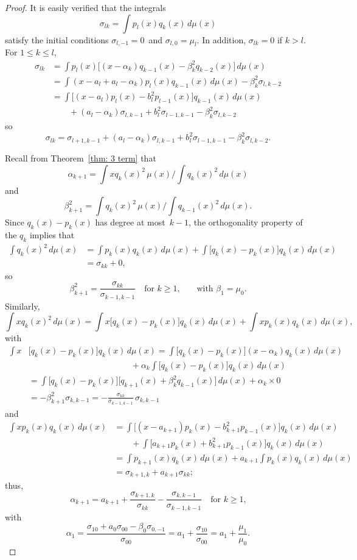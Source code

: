 \documentclass[12pt,a4paper]{article}
\begin{document}
\begin{proof}
It is easily verified that the integrals
\[
\sigma_{lk}=\int p_l(x)q_k(x)\,d\mu(x)
\]
satisfy the initial conditions $\sigma_{l,-1}=0$~and 
$\sigma_{l,0}=\mu_l$.  In addition, $\sigma_{lk}=0$ if $k>l$. 
For $1\le k\le l$,
\begin{align*}
\sigma_{lk}&=\int p_l(x)\bigl[
(x-\alpha_k)q_{k-1}(x)-\beta_k^2q_{k-2}(x)\bigr]\,d\mu(x)\\
	&=\int(x-a_l+a_l-\alpha_k)p_l(x)q_{k-1}(x)\,d\mu(x)
		-\beta_k^2\sigma_{l,k-2}\\
	&=\int\bigl[(x-a_l)p_l(x)-b_l^2p_{l-1}(x)\bigr]
		q_{k-1}(x)\,d\mu(x)\\
	&\qquad{}+(a_l-\alpha_k)\sigma_{l,k-1}
		+b_l^2\sigma_{l-1,k-1}-\beta_k^2\sigma_{l,k-2}
\end{align*}
so
\[
\sigma_{lk}=\sigma_{l+1,k-1}+(a_l-\alpha_k)\sigma_{l,k-1}
		+b_l^2\sigma_{l-1,k-1}-\beta_k^2\sigma_{l,k-2}.
\]

Recall from Theorem~\ref{thm: 3 term} that
\[
\alpha_{k+1}=\int xq_k(x)^2\,\mu(x)\bigg/\int q_k(x)^2\,d\mu(x)
\]
and
\[
\beta_{k+1}^2=\int q_k(x)^2\,\mu(x)\bigg/\int q_{k-1}(x)^2\,d\mu(x).
\]
Since $q_k(x)-p_k(x)$ has degree at most~$k-1$, the orthogonality 
property of the $q_k$ implies that
\begin{align*}
\int q_k(x)^2\,d\mu(x)&=\int p_k(x)q_k(x)\,d\mu(x)
	+\int\bigl[q_k(x)-p_k(x)\bigr]q_k(x)\,d\mu(x)\\
	&=\sigma_{kk}+0,
\end{align*}
so
\[
\beta_{k+1}^2=\frac{\sigma_{kk}}{\sigma_{k-1,k-1}}
	\quad\text{for $k\ge1$,}
	\qquad\text{with $\beta_1=\mu_0$.}
\]
Similarly,
\[
\int x q_k(x)^2\,d\mu(x)
	=\int x\bigl[q_k(x)-p_k(x)\bigr]q_k(x)\,d\mu(x)
	+\int xp_k(x)q_k(x)\,d\mu(x),
\]
with
\begin{align*}
\int x&\bigl[q_k(x)-p_k(x)\bigr]q_k(x)\,d\mu(x)
	=\int\bigl[q_k(x)-p_k(x)\bigr](x-\alpha_k)q_k(x)\,d\mu(x)\\
	&\qquad\qquad\qquad\qquad\qquad\qquad{}+\alpha_k\int 
		\bigl[q_k(x)-p_k(x)\bigr]q_k(x)\,d\mu(x)\\
	&=\int\bigl[q_k(x)-p_k(x)\bigr]
	\bigl[q_{k+1}(x)+\beta_k^2 q_{k-1}(x)\bigr] 
		\,d\mu(x)+\alpha_k\times0\\
	&=-\beta_{k+1}^2\sigma_{k,k-1}
	=-\frac{\sigma_{kk}}{\sigma_{k-1,k-1}}\,\sigma_{k,k-1}
\end{align*}
and
\begin{align*}
\int xp_k(x)q_k(x)\,d\mu(x)&=\int\bigl[
	(x-a_{k+1})p_k(x)-b_{k+1}^2p_{k-1}(x)\bigr]q_k(x)\,d\mu(x)\\
	&\qquad{}+\int\bigl[
		a_{k+1}p_k(x)+b_{k+1}^2p_{k-1}(x)\bigr]q_k(x)\,d\mu(x)\\
	&=\int p_{k+1}(x)q_k(x)\,d\mu(x)
		+a_{k+1}\int p_k(x)q_k(x)\,d\mu(x)\\
	&=\sigma_{k+1,k}+a_{k+1}\sigma_{kk};
\end{align*}
thus,
\[
\alpha_{k+1}=a_{k+1}+\frac{\sigma_{k+1,k}}{\sigma_{kk}}
	-\frac{\sigma_{k,k-1}}{\sigma_{k-1,k-1}}
	\quad\text{for $k\ge1$,}
\]
with
\[
\alpha_1=\frac{\sigma_{10}+a_0\sigma_{00}-\beta_0\sigma_{0,-1}}%
{\sigma_{00}}=a_1+\frac{\sigma_{10}}{\sigma_{00}}
	=a_1+\frac{\mu_1}{\mu_0}.
\]
\end{proof}
\end{document}

